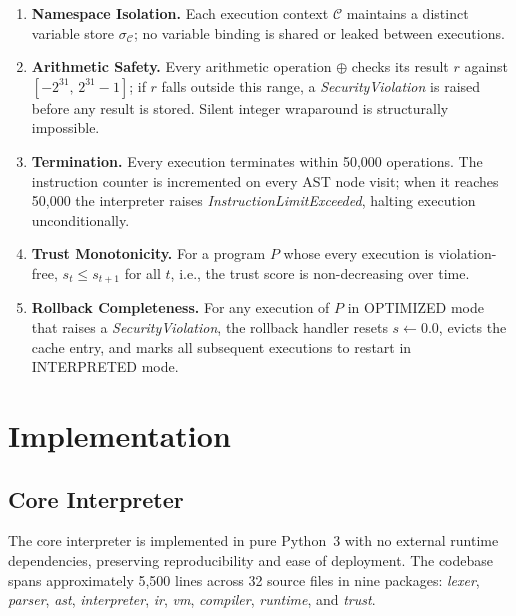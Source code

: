 \documentclass[conference]{IEEEtran}
\begin{document}
\begin{enumerate}
  \item[\textbf{G1.}] \textbf{Namespace Isolation.} Each execution
    context $\mathcal{C}$ maintains a distinct variable store
    $\sigma_\mathcal{C}$; no variable binding is shared or leaked
    between executions.

  \item[\textbf{G2.}] \textbf{Arithmetic Safety.} Every arithmetic
    operation $\oplus$ checks its result $r$ against
    $[-2^{31},\,2^{31}-1]$; if $r$ falls outside this range, a
    \textit{SecurityViolation} is raised before any result is stored.
    Silent integer wraparound is structurally impossible.

  \item[\textbf{G3.}] \textbf{Termination.} Every execution
    terminates within 50,000 operations. The instruction counter is
    incremented on every AST node visit; when it reaches 50,000 the
    interpreter raises \textit{InstructionLimitExceeded}, halting
    execution unconditionally.

  \item[\textbf{G4.}] \textbf{Trust Monotonicity.} For a program
    $P$ whose every execution is violation-free,
    $s_t \leq s_{t+1}$ for all $t$, i.e., the trust score is
    non-decreasing over time.

  \item[\textbf{G5.}] \textbf{Rollback Completeness.} For any
    execution of $P$ in OPTIMIZED mode that raises a
    \textit{SecurityViolation}, the rollback handler resets
    $s \leftarrow 0.0$, evicts the cache entry, and marks all
    subsequent executions to restart in INTERPRETED mode.
\end{enumerate}

\section{Implementation}
\label{sec:impl}

\subsection{Core Interpreter}

The core interpreter is implemented in pure Python~3 with no
external runtime dependencies, preserving reproducibility and ease
of deployment. The codebase spans approximately 5,500 lines across
32 source files in nine packages: \textit{lexer}, \textit{parser},
\textit{ast}, \textit{interpreter}, \textit{ir}, \textit{vm},
\textit{compiler}, \textit{runtime}, and \textit{trust}.
\end{document}
